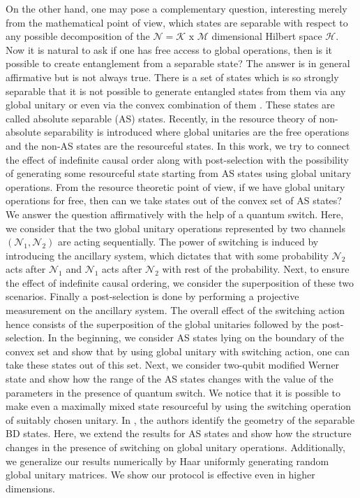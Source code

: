 On the other hand, one may pose a complementary question, interesting merely from the mathematical point of view, which states are separable with respect to any possible decomposition of the $\mathcal{N} = \mathcal{K} \text{ x } \mathcal{M}$ dimensional Hilbert space $\mathcal{H}$. Now it is natural to ask if one has free access to global operations, then is it possible to create entanglement from a separable state? The answer is in general affirmative but is not always true. There is a set of states which is so strongly separable that it is not possible to generate entangled states from them via any global unitary or even via the convex combination of them \cite{KZ_01, VAD_01, KC_01, LHL_03}. These states are called absolute separable (AS) states. Recently, in \cite{PMD_22} the resource theory of non-absolute separability is introduced where global unitaries are the free operations and the non-AS states are the resourceful states. 
In this work, we try to connect the effect of indefinite causal order along with post-selection with the possibility of generating some resourceful state starting from AS states using global unitary operations. From the resource theoretic point of view, if we have global unitary operations for free, then can we take states out of the convex set of AS states? We answer the question affirmatively with the help of a quantum switch. Here, we consider that the two global unitary operations represented by two channels $(\mathcal{N}_1, \mathcal{N}_2)$ are acting sequentially. The power of switching is induced by introducing the ancillary system, which dictates that with some probability $\mathcal{N}_2$ acts after $\mathcal{N}_1$ and $\mathcal{N}_1$ acts after $\mathcal{N}_2$ with rest of the probability. Next, to ensure the effect of indefinite causal ordering, we consider the superposition of these two scenarios. Finally a post-selection is done by performing a projective measurement on the ancillary system. The overall effect of the switching action hence consists of the superposition of the global unitaries followed by the post-selection. In the beginning, we consider AS states lying on the boundary of the convex set and show that by using global unitary with switching action, one can take these states out of this set. Next, we consider two-qubit modified Werner state and show how the range of the AS states changes with the value of the parameters in the presence of quantum switch. We notice that it is possible to make even a maximally mixed state resourceful by using the switching operation of suitably chosen unitary. In \cite{LC_10}, the authors identify the geometry of the separable BD states. Here, we extend the results for AS states and show how the structure changes in the presence of switching on global unitary operations. Additionally, we generalize our results numerically by Haar uniformly generating random global unitary matrices. We show our protocol is effective even in higher dimensions.

